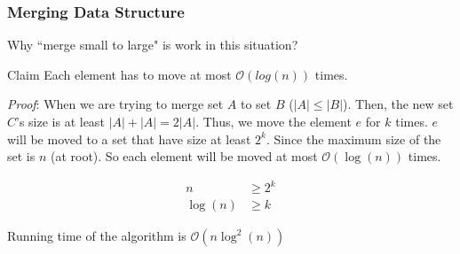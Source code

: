 \begin{frame}
\frametitle{Merging Data Structure}
Why ``merge small to large" is work in this situation?

\begin{block}{Claim}
Each element has to move at most $\mathcal{O}(log(n))$ times.
\end{block}

\textit{Proof}: When we are trying to merge set $A$ to set $B$ ($|A| \le |B|$). Then, the new set $C$'s size is at least $|A| + |A| = 2|A|$. Thus, we move the element $e$ for $k$ times. $e$ will be moved to a set that have size at least $2^k$. Since the maximum size of the set is $n$ (at root). So each element will be moved at most $\mathcal{O}(\log(n))$ times.

\begin{equation}
\nonumber
\begin{aligned}
    n &\ge 2^k\\
    \log(n) &\ge k
\end{aligned}
\end{equation}

\vfill

Running time of the algorithm is $\mathcal{O}(n \log^2(n))$
\end{frame}